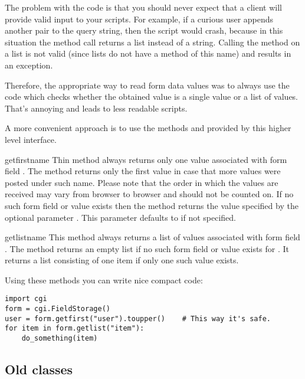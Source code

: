 The problem with the code is that you should never expect that a
client will provide valid input to your scripts.  For example, if a
curious user appends another  pair to the query string,
then the script would crash, because in this situation the
 method call returns a list instead of a
string.  Calling the  method on a list is not valid
(since lists do not have a method of this name) and results in an
 exception.

Therefore, the appropriate way to read form data values was to always
use the code which checks whether the obtained value is a single value
or a list of values.  That's annoying and leads to less readable
scripts.

A more convenient approach is to use the methods 
and  provided by this higher level interface.

\begin{methoddesc}[FieldStorage]{getfirst}{name}
  Thin method always returns only one value associated with form field
  .  The method returns only the first value in case that
  more values were posted under such name.  Please note that the order
  in which the values are received may vary from browser to browser
  and should not be counted on.  If no such form field or value exists
  then the method returns the value specified by the optional
  parameter .  This parameter defaults to  if
  not specified.
\end{methoddesc}

\begin{methoddesc}[FieldStorage]{getlist}{name}
  This method always returns a list of values associated with form
  field .  The method returns an empty list if no such form
  field or value exists for .  It returns a list consisting
  of one item if only one such value exists.
\end{methoddesc}

Using these methods you can write nice compact code:

\begin{verbatim}
import cgi
form = cgi.FieldStorage()
user = form.getfirst("user").toupper()    # This way it's safe.
for item in form.getlist("item"):
    do_something(item)
\end{verbatim}


\subsection{Old classes}

